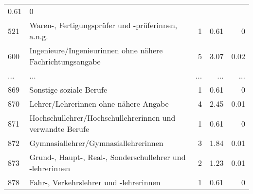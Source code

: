 \begin{longtable}{lXrrr}
          \num[round-mode=places,round-precision=2]{0,61} &
          \num[round-mode=places,round-precision=2]{0} \\
        521 & \multicolumn{1}{X}{Waren-, Fertigungsprüfer und -prüferinnen, a.n.g.} & %
          \num{1} &
          \num[round-mode=places,round-precision=2]{0,61} &
          \num[round-mode=places,round-precision=2]{0} \\
        600 & \multicolumn{1}{X}{Ingenieure/Ingenieurinnen ohne nähere Fachrichtungsangabe} & %
          \num{5} &
          \num[round-mode=places,round-precision=2]{3,07} &
          \num[round-mode=places,round-precision=2]{0,02} \\
       ... & ... & ... & ... & ... \\
        869 & \multicolumn{1}{X}{Sonstige soziale Berufe} & %
          \num{1} &
          \num[round-mode=places,round-precision=2]{0,61} &
          \num[round-mode=places,round-precision=2]{0} \\

        870 & \multicolumn{1}{X}{Lehrer/Lehrerinnen ohne nähere Angabe} & %
          \num{4} &
          \num[round-mode=places,round-precision=2]{2,45} &
          \num[round-mode=places,round-precision=2]{0,01} \\

        871 & \multicolumn{1}{X}{Hochschullehrer/Hochschullehrerinnen und verwandte Berufe} & %
          \num{1} &
          \num[round-mode=places,round-precision=2]{0,61} &
          \num[round-mode=places,round-precision=2]{0} \\

        872 & \multicolumn{1}{X}{Gymnasiallehrer/Gymnasiallehrerinnen} & %
          \num{3} &
          \num[round-mode=places,round-precision=2]{1,84} &
          \num[round-mode=places,round-precision=2]{0,01} \\

        873 & \multicolumn{1}{X}{Grund-, Haupt-, Real-, Sonderschullehrer und -lehrerinnen} & %
          \num{2} &
          \num[round-mode=places,round-precision=2]{1,23} &
          \num[round-mode=places,round-precision=2]{0,01} \\

        878 & \multicolumn{1}{X}{Fahr-, Verkehrslehrer und -lehrerinnen} & %
          \num{1} &
          \num[round-mode=places,round-precision=2]{0,61} &
          \num[round-mode=places,round-precision=2]{0} \\


\end{longtable}
